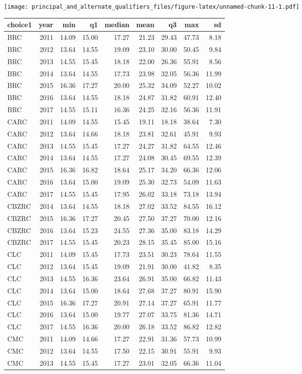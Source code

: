 \documentclass[]{article}
\begin{document}
\texttt{[image: principal\_and\_alternate\_qualifiers\_files/figure-latex/unnamed-chunk-11-1.pdf]}

\begin{longtable}[]{@{}lrrrrrrrr@{}}
\toprule
choice1 & year & min & q1 & median & mean & q3 & max & sd\tabularnewline
\midrule
\endhead
BRC & 2011 & 14.09 & 15.00 & 17.27 & 21.23 & 29.43 & 47.73 &
8.18\tabularnewline
BRC & 2012 & 13.64 & 14.55 & 19.09 & 23.10 & 30.00 & 50.45 &
9.84\tabularnewline
BRC & 2013 & 14.55 & 15.45 & 18.18 & 22.00 & 26.36 & 55.91 &
8.56\tabularnewline
BRC & 2014 & 13.64 & 14.55 & 17.73 & 23.98 & 32.05 & 56.36 &
11.99\tabularnewline
BRC & 2015 & 16.36 & 17.27 & 20.00 & 25.32 & 34.09 & 52.27 &
10.02\tabularnewline
BRC & 2016 & 13.64 & 14.55 & 18.18 & 24.87 & 31.82 & 60.91 &
12.40\tabularnewline
BRC & 2017 & 14.55 & 15.11 & 16.36 & 24.25 & 32.16 & 56.36 &
11.91\tabularnewline
CARC & 2011 & 14.09 & 14.55 & 15.45 & 19.11 & 18.18 & 38.64 &
7.30\tabularnewline
CARC & 2012 & 13.64 & 14.66 & 18.18 & 23.81 & 32.61 & 45.91 &
9.93\tabularnewline
CARC & 2013 & 14.55 & 15.45 & 17.27 & 24.27 & 31.82 & 64.55 &
12.46\tabularnewline
CARC & 2014 & 13.64 & 14.55 & 17.27 & 24.08 & 30.45 & 69.55 &
12.39\tabularnewline
CARC & 2015 & 16.36 & 16.82 & 18.64 & 25.17 & 34.20 & 66.36 &
12.06\tabularnewline
CARC & 2016 & 13.64 & 15.00 & 19.09 & 25.30 & 32.73 & 54.09 &
11.63\tabularnewline
CARC & 2017 & 14.55 & 15.45 & 17.95 & 26.02 & 33.18 & 73.18 &
13.94\tabularnewline
CBZRC & 2014 & 13.64 & 14.55 & 18.18 & 27.02 & 33.52 & 84.55 &
16.12\tabularnewline
CBZRC & 2015 & 16.36 & 17.27 & 20.45 & 27.50 & 37.27 & 70.00 &
12.16\tabularnewline
CBZRC & 2016 & 13.64 & 15.23 & 24.55 & 27.36 & 35.00 & 83.18 &
14.29\tabularnewline
CBZRC & 2017 & 14.55 & 15.45 & 20.23 & 28.15 & 35.45 & 85.00 &
15.16\tabularnewline
CLC & 2011 & 14.09 & 15.45 & 17.73 & 23.51 & 30.23 & 78.64 &
11.55\tabularnewline
CLC & 2012 & 13.64 & 15.45 & 19.09 & 21.91 & 30.00 & 41.82 &
8.35\tabularnewline
CLC & 2013 & 14.55 & 16.36 & 23.64 & 26.91 & 35.00 & 66.82 &
11.43\tabularnewline
CLC & 2014 & 13.64 & 15.00 & 18.64 & 27.68 & 37.27 & 80.91 &
15.90\tabularnewline
CLC & 2015 & 16.36 & 17.27 & 20.91 & 27.14 & 37.27 & 65.91 &
11.77\tabularnewline
CLC & 2016 & 13.64 & 15.00 & 19.77 & 27.07 & 33.75 & 81.36 &
14.71\tabularnewline
CLC & 2017 & 14.55 & 16.36 & 20.00 & 26.18 & 33.52 & 86.82 &
12.82\tabularnewline
CMC & 2011 & 14.09 & 14.66 & 17.27 & 22.91 & 31.36 & 57.73 &
10.99\tabularnewline
CMC & 2012 & 13.64 & 14.55 & 17.50 & 22.15 & 30.91 & 55.91 &
9.93\tabularnewline
CMC & 2013 & 14.55 & 15.45 & 17.27 & 23.01 & 32.05 & 66.36 &
11.04\tabularnewline

\end{longtable}
\end{document}
